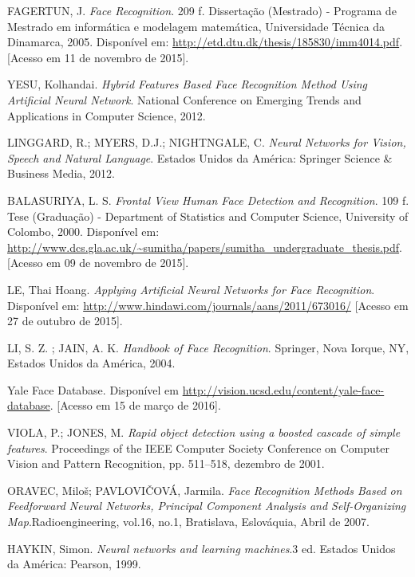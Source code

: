 \documentclass[hidelinks,11pt,twocolumn]{article}
\begin{document}
\begin{thebibliography}{1}
  
  	 		FAGERTUN, J. {\em Face Recognition}. 209 f. Dissertação (Mestrado) - Programa de Mestrado em informática e modelagem matemática, Universidade Técnica da Dinamarca, 2005. Disponível em: \url{http://etd.dtu.dk/thesis/185830/imm4014.pdf}. [Acesso em 11 de novembro de 2015].
	
		 			YESU, Kolhandai. {\em Hybrid Features Based Face Recognition Method Using Artificial Neural Network}. National Conference on Emerging Trends and Applications in Computer Science, 2012.
	
	 	LINGGARD, R.; MYERS, D.J.; NIGHTNGALE, C. {\em Neural Networks for Vision, Speech and Natural Language}. Estados Unidos da América: Springer Science \& Business Media, 2012.
	
	 	BALASURIYA, L. S. {\em Frontal View Human Face Detection and Recognition}. 109 f. Tese (Graduação) - Department of Statistics and Computer Science, University of Colombo, 2000. Disponível em:    \url{http://www.dcs.gla.ac.uk/~sumitha/papers/sumitha_undergraduate_thesis.pdf}. [Acesso em 09 de novembro de 2015].

						LE, Thai Hoang. {\em Applying Artificial Neural Networks for Face Recognition}. Disponível em: \url{http://www.hindawi.com/journals/aans/2011/673016/} [Acesso em 27 de outubro de 2015].

						LI, S. Z. ; JAIN, A. K. {\em Handbook of Face Recognition}. Springer, Nova Iorque, NY, Estados Unidos da América, 2004.

					Yale Face Database. Disponível em \url{http://vision.ucsd.edu/content/yale-face-database}. [Acesso em 15 de março de 2016].

		VIOLA, P.; JONES, M. {\em Rapid object detection using a boosted cascade of simple features}. Proceedings of the IEEE Computer Society Conference on Computer Vision and Pattern Recognition, pp. 511–518, dezembro de 2001.
		
	 			ORAVEC, Miloš; PAVLOVIČOVÁ, Jarmila. {\em Face Recognition Methods Based on Feedforward Neural Networks, Principal Component Analysis and Self-Organizing Map}.Radioengineering, vol.16, no.1, Bratislava, Eslováquia, Abril de 2007.
	
				HAYKIN, Simon. {\em Neural networks and learning machines}.3 ed. Estados Unidos da América: Pearson, 1999.

  \end{thebibliography}
\end{document}
